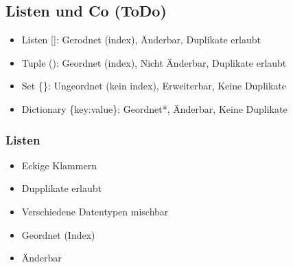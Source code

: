 \documentclass[11pt]{article}
\providecommand{\tightlist}{%
      \setlength{\itemsep}{0pt}\setlength{\parskip}{0pt}}
\begin{document}
    \hypertarget{listen-und-co-todo}{%
\subsection{Listen und Co (ToDo)}\label{listen-und-co-todo}}

\begin{itemize}
\tightlist
\item
  Listen {[}{]}: Gerodnet (index), Änderbar, Duplikate erlaubt
\item
  Tuple (): Geordnet (index), Nicht Änderbar, Duplikate erlaubt
\item
  Set \{\}: Ungeordnet (kein index), Erweiterbar, Keine Duplikate
\item
  Dictionary \{key:value\}: Geordnet*, Änderbar, Keine Duplikate
\end{itemize}

    \hypertarget{listen}{%
\subsubsection{Listen}\label{listen}}

\begin{itemize}
\tightlist
\item
  Eckige Klammern
\item
  Dupplikate erlaubt
\item
  Verschiedene Datentypen mischbar
\item
  Geordnet (Index)
\item
  Änderbar
\end{itemize}
\end{document}
